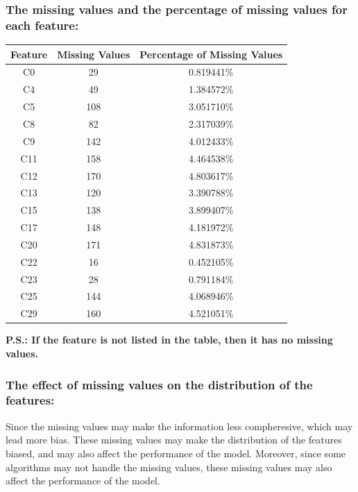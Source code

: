 \documentclass{article}
\begin{document}
\subsubsection*{The missing values and the percentage of missing values for each feature:}
\begin{center}
    \begin{tabular}{|c|c|c|}
        \hline
        Feature & Missing Values & Percentage of Missing Values \\
        \hline
        C0 & 29 & 0.819441\% \\
        C4 & 49 & 1.384572\% \\
        C5 & 108 & 3.051710\% \\
        C8 & 82 & 2.317039\% \\
        C9 & 142 & 4.012433\% \\
        C11 & 158 & 4.464538\% \\
        C12 & 170 & 4.803617\% \\
        C13 & 120 & 3.390788\% \\
        C15 & 138 & 3.899407\% \\
        C17 & 148 & 4.181972\% \\
        C20 & 171 & 4.831873\% \\
        C22 & 16 & 0.452105\% \\
        C23 & 28 & 0.791184\% \\
        C25 & 144 & 4.068946\% \\
        C29 & 160 & 4.521051\% \\
        \hline
    \end{tabular}
    \newline
    \textbf{P.S.: If the feature is not listed in the table, then it has no missing values.}
\end{center}

\subsubsection*{The effect of missing values on the distribution of the features:}
Since the missing values may make the information less compheresive, which may lead more bias. 
These missing values may make the distribution of the features biased, 
and may also affect the performance of the model. 
Moreover, since some algorithms may not handle the missing values, these missing values may also affect the performance of the model.
\end{document}
